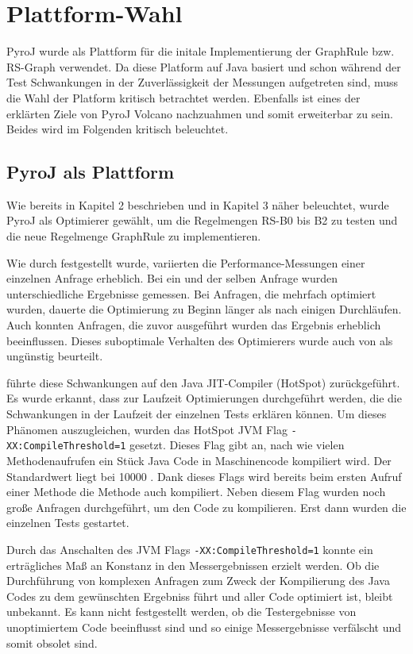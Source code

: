 \section{Plattform-Wahl}

PyroJ wurde als Plattform für die initale Implementierung der GraphRule bzw. RS-Graph verwendet. Da diese Platform auf Java basiert und schon während der Test Schwankungen in der Zuverlässigkeit der Messungen aufgetreten sind, muss die Wahl der Platform kritisch betrachtet werden. Ebenfalls ist eines der erklärten Ziele von PyroJ Volcano nachzuahmen und somit erweiterbar zu sein. Beides wird im Folgenden kritisch beleuchtet.


\subsection{PyroJ als Plattform}

Wie bereits in Kapitel 2 beschrieben und in Kapitel 3 näher beleuchtet, wurde PyroJ als Optimierer gewählt, um die Regelmengen RS-B0 bis B2 zu testen und die neue Regelmenge GraphRule zu implementieren.

Wie durch \cite{shanbhag2014optimizing} festgestellt wurde, variierten die Performance-Messungen einer einzelnen Anfrage erheblich. Bei ein und der selben Anfrage wurden unterschiedliche Ergebnisse gemessen. Bei Anfragen, die mehrfach optimiert wurden, dauerte die Optimierung zu Beginn länger als nach einigen Durchläufen. Auch konnten Anfragen, die zuvor ausgeführt wurden das Ergebnis erheblich beeinflussen. Dieses suboptimale Verhalten des Optimierers wurde auch von \cite{shanbhag2014optimizing} als ungünstig beurteilt.

\cite{shanbhag2014optimizing} führte diese Schwankungen auf den Java JIT-Compiler (HotSpot) zurückgeführt. Es wurde erkannt, dass zur Laufzeit Optimierungen durchgeführt werden, die die Schwankungen in der Laufzeit der einzelnen Tests erklären können. Um dieses Phänomen auszugleichen, wurden das HotSpot JVM Flag \texttt{-XX:CompileThreshold=1} gesetzt. Dieses Flag gibt an, nach wie vielen Methodenaufrufen ein Stück Java Code in Maschinencode kompiliert wird. Der Standardwert liegt bei 10000 \cite{oracle2015VMOptions}. Dank dieses Flags wird bereits beim ersten Aufruf einer Methode die Methode auch kompiliert. Neben diesem Flag wurden noch große Anfragen durchgeführt, um den Code zu kompilieren. Erst dann wurden die einzelnen Tests gestartet.


Durch das Anschalten des JVM Flags \texttt{-XX:CompileThreshold=1} konnte ein erträgliches Maß an Konstanz in den Messergebnissen erzielt werden. 
Ob die Durchführung von komplexen Anfragen zum Zweck der Kompilierung des Java Codes zu dem gewünschten Ergebniss führt und aller Code optimiert ist, bleibt unbekannt. Es kann nicht festgestellt werden, ob die Testergebnisse von unoptimiertem Code beeinflusst sind und so einige Messergebnisse verfälscht und somit obsolet sind.

